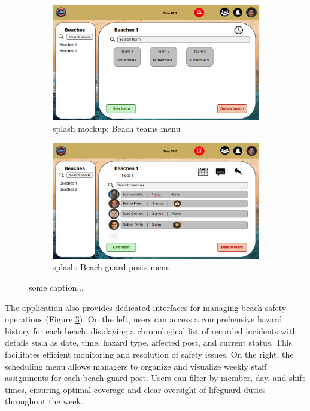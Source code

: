 \begin{figure}[H]
    \centering
    \begin{subfigure}{0.48\textwidth}
    \centering
    \includegraphics[width=\linewidth]{figs/Mockups/ppt-mockups-beach-teams.png}
    \caption{\ac{splash} mockup: Beach teams menu}
    \label{fig:ppt-mockups-teams}
    \end{subfigure}
    \hfill
    \begin{subfigure}{0.48\textwidth}
    \centering
    \includegraphics[width=\linewidth]{figs/Mockups/ppt-mockups-posts.png}
    \caption{\ac{splash}: Beach guard posts menu}
    \label{fig:ppt-mockups-posts}
    \end{subfigure}
    \caption{some caption...}
    \label{fig:ppt-map-team-management}
\end{figure}

The application also provides dedicated interfaces for managing beach safety operations (Figure \ref{fig:ppt-map-team-management}). On the left, users can access a comprehensive hazard history for each beach, displaying a chronological list of recorded incidents with details such as date, time, hazard type, affected post, and current status. This facilitates efficient monitoring and resolution of safety issues. On the right, the scheduling menu allows managers to organize and visualize weekly staff assignments for each beach guard post. Users can filter by member, day, and shift times, ensuring optimal coverage and clear oversight of lifeguard duties throughout the week.

